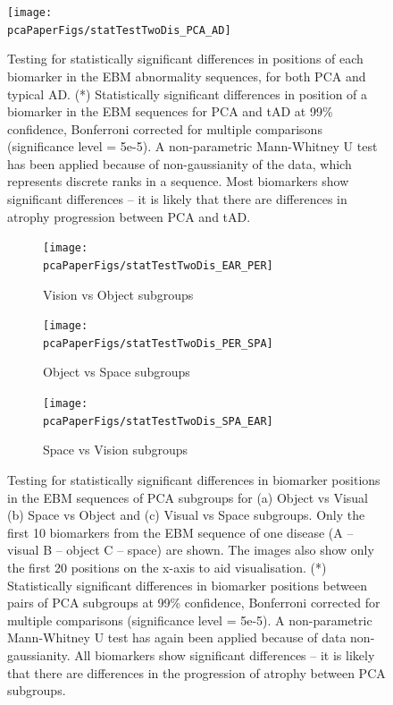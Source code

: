 \begin{figure}
 \texttt{[image: \\pcaPaperFigs/statTestTwoDis\_PCA\_AD]}
 \caption[Testing for statistically significant differences in positions of each biomarker in the EBM abnormality sequences, for both PCA and typical AD.]{Testing for statistically significant differences in positions of each biomarker in the EBM abnormality sequences, for both PCA and typical AD. (*) Statistically significant differences in position of a biomarker in the EBM sequences for PCA and tAD at 99\% confidence, Bonferroni corrected for multiple comparisons (significance level = 5e-5). A non-parametric Mann-Whitney U test has been applied because of non-gaussianity of the data, which represents discrete ranks in a sequence. Most biomarkers show significant differences -- it is likely that there are differences in atrophy progression between PCA and tAD.}
 \label{fig:ebmStatTestPcaAd}
\end{figure}


\begin{figure}
\begin{subfigure}{\textwidth}
\texttt{[image: \\pcaPaperFigs/statTestTwoDis\_EAR\_PER]}
\caption{Vision vs Object subgroups}
\end{subfigure}

\begin{subfigure}{\textwidth}
\texttt{[image: \\pcaPaperFigs/statTestTwoDis\_PER\_SPA]}
\caption{Object vs Space subgroups}
\end{subfigure}


\begin{subfigure}{\textwidth}
\texttt{[image: \\pcaPaperFigs/statTestTwoDis\_SPA\_EAR]}
\caption{Space vs Vision subgroups}
\end{subfigure}

\caption[Testing for statistically significant differences in biomarker positions in the EBM sequences of PCA subgroups.]{Testing for statistically significant differences in biomarker positions in the EBM sequences of PCA subgroups for (a) Object vs Visual (b) Space vs Object and (c) Visual vs Space subgroups.  Only the first 10 biomarkers from the EBM sequence of one disease (A -- visual B -- object C -- space) are shown. The images also show only the first 20 positions on the x-axis to aid visualisation. (*) Statistically significant differences in biomarker positions between pairs of PCA subgroups at 99\% confidence, Bonferroni corrected for multiple comparisons (significance level = 5e-5). A non-parametric Mann-Whitney U test has again been applied because of data non-gaussianity. All biomarkers show significant differences -- it is likely that there are differences in the progression of atrophy between PCA subgroups.}
\label{fig:ebmStatTestPcaSubgroups}
\end{figure}



